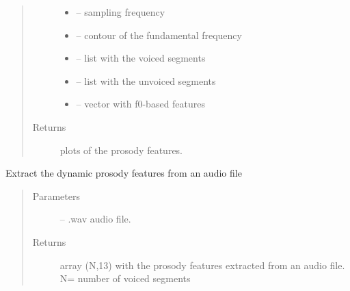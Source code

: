 \documentclass[letterpaper,10pt,english]{sphinxmanual}
\begin{document}
\begin{fulllineitems}
\begin{fulllineitems}
\begin{quote}
\begin{description}
\begin{itemize}
\item {} 
 -- sampling frequency

\item {} 
 -- contour of the fundamental frequency

\item {} 
 -- list with the voiced segments

\item {} 
 -- list with the unvoiced segments

\item {} 
 -- vector with f0-based features

\end{itemize}

\item[{Returns}] \leavevmode
plots of the prosody features.

\end{description}\end{quote}

\end{fulllineitems}


\begin{fulllineitems}
\label{\detokenize{Prosody:prosody.Prosody.prosody_dynamic}}
Extract the dynamic prosody features from an audio file
\begin{quote}\begin{description}
\item[{Parameters}] \leavevmode
{} -- .wav audio file.

\item[{Returns}] \leavevmode
array (N,13) with the prosody features extracted from an audio file.  N= number of voiced segments

\end{description}\end{quote}

\begin{sphinxVerbatim}[commandchars=\\\{\}]
\end{sphinxVerbatim}


\end{fulllineitems}
\end{fulllineitems}
\end{document}
